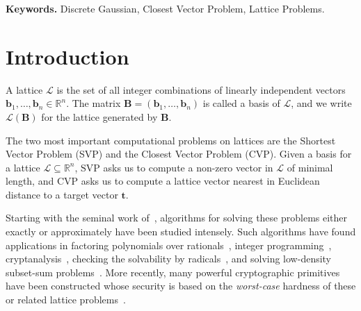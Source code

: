 \documentclass[11pt]{article}
\newcommand{\R}{\ensuremath{\mathbb{R}}}
\renewcommand{\vec}[1]{\ensuremath{\mathbf{#1}}}
\newcommand{\basis}{\ensuremath{\mathbf{B}}}
\newcommand{\problem}[1]{\mbox{#1}\xspace}
\newcommand{\lat}{\mathcal{L}}
\begin{document}
\textbf{Keywords.}  Discrete Gaussian, Closest Vector Problem, Lattice Problems.


\section{Introduction}
\label{sec:introduction}
A lattice $\lat$ is the set of all integer combinations of
linearly independent vectors $\vec{b}_1,\dots,\vec{b}_n \in \R^n$. The matrix
$\basis=(\vec{b}_1,\dots,\vec{b}_n)$ is called a basis of $\lat$, and we write
$\lat(\basis)$ for the lattice generated by $\basis$.

The two most important computational problems on lattices are the Shortest Vector Problem (\problem{SVP}) and the Closest Vector Problem (\problem{CVP}). Given a basis for a lattice $\lat \subseteq \R^n$,
$\problem{SVP}$ asks us to compute a non-zero vector in $\lat$ of minimal length, and \problem{CVP} asks us to compute a lattice vector nearest in Euclidean distance to a target vector $\vec{t}$.

Starting with the seminal work of~\cite{LLL82}, algorithms for solving these problems either exactly or approximately have been studied intensely. Such algorithms have found applications in factoring polynomials over rationals~\cite{LLL82}, integer programming~\cite{Len83,Kan87,DPV11}, cryptanalysis~\cite{Odl90,JS98,NS01}, checking the solvability
by radicals~\cite{LM83}, and solving low-density subset-sum problems~\cite{CJLOSS92}. More recently, many powerful cryptographic primitives have been constructed whose security is based on the {\em worst-case} hardness of these or related lattice problems~\cite{Ajt96,MR07,Gen09,Reg09,BV11,BLPRS13,BV14}.
\end{document}
